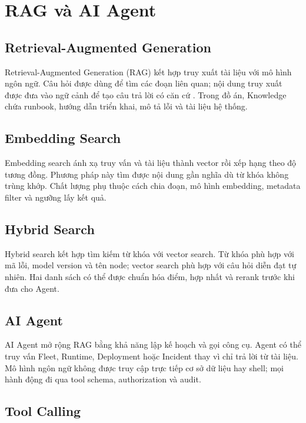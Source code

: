 \section{RAG và AI Agent}

\subsection{Retrieval-Augmented Generation}

Retrieval-Augmented Generation (RAG) kết hợp truy xuất tài liệu với mô hình
ngôn ngữ. Câu hỏi được dùng để tìm các đoạn liên quan; nội dung truy xuất được
đưa vào ngữ cảnh để tạo câu trả lời có căn cứ \cite{lewis2020rag}. Trong đồ án,
Knowledge chứa runbook, hướng dẫn triển khai, mô tả lỗi và tài liệu hệ thống.

\subsection{Embedding Search}

Embedding search ánh xạ truy vấn và tài liệu thành vector rồi xếp hạng theo độ
tương đồng. Phương pháp này tìm được nội dung gần nghĩa dù từ khóa không trùng
khớp. Chất lượng phụ thuộc cách chia đoạn, mô hình embedding, metadata filter và
ngưỡng lấy kết quả.

\subsection{Hybrid Search}

Hybrid search kết hợp tìm kiếm từ khóa với vector search. Từ khóa phù hợp với mã
lỗi, model version và tên node; vector search phù hợp với câu hỏi diễn đạt tự
nhiên. Hai danh sách có thể được chuẩn hóa điểm, hợp nhất và rerank trước khi đưa
cho Agent.

\subsection{AI Agent}

AI Agent mở rộng RAG bằng khả năng lập kế hoạch và gọi công cụ. Agent có thể
truy vấn Fleet, Runtime, Deployment hoặc Incident thay vì chỉ trả lời từ tài liệu.
Mô hình ngôn ngữ không được truy cập trực tiếp cơ sở dữ liệu hay shell; mọi hành
động đi qua tool schema, authorization và audit.

\subsection{Tool Calling}

